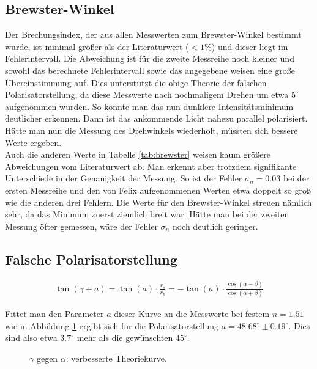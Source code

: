 \documentclass[12pt,a4paper,titlepage,headinclude,bibtotoc]{scrartcl}
\begin{document}
\subsection{Brewster-Winkel}
Der Brechungsindex, der aus allen Messwerten zum Brewster-Winkel bestimmt wurde, ist minimal größer als der Literaturwert ($< 1\%$) und dieser liegt im Fehlerintervall.
Die Abweichung ist für die zweite Messreihe noch kleiner und sowohl das berechnete Fehlerintervall sowie das angegebene weisen eine große Übereinstimmung auf.
Dies unterstützt die obige Theorie der falschen Polarisatorstellung, da diese Messwerte nach nochmaligem Drehen um etwa $5^\circ$ aufgenommen wurden.
So konnte man das nun dunklere Intensitätsminimum deutlicher erkennen.
Dann ist das ankommende Licht nahezu parallel polarisiert.
Hätte man nun die Messung des Drehwinkels wiederholt, müssten sich bessere Werte ergeben.\\

Auch die anderen Werte in Tabelle \ref{tab:brewster} weisen kaum größere Abweichungen vom Literaturwert ab.
Man erkennt aber trotzdem signifikante Unterschiede in der Genauigkeit der Messung.
So ist der Fehler $\sigma_n=0.03$ bei der ersten Messreihe und den von Felix aufgenommenen Werten etwa doppelt so groß wie die anderen drei Fehlern.
Die Werte für den Brewster-Winkel streuen nämlich sehr, da das Minimum zuerst ziemlich breit war.
Hätte man bei der zweiten Messung öfter gemessen, wäre der Fehler $\sigma_n$ noch deutlich geringer.

\subsection{Falsche Polarisatorstellung}

\begin{align}
	\tan(\gamma+a)=\tan(a)\cdot\frac{r_s}{r_p}=-\tan(a)\cdot\frac{\cos(\alpha-\beta)}{\cos(\alpha+\beta)}
\end{align}

Fittet man den Parameter $a$ dieser Kurve an die Messwerte bei festem $n=1.51$ wie in Abbildung \ref{fig:drehung_disk} ergibt sich für die Polarisatorstellung $a=48.68^\circ \pm 0.19^\circ$.
Dies sind also etwa $3.7^\circ$ mehr als die gewünschten $45^\circ$.

\begin{figure}[!htb]
	\centering
	
	\caption{$\gamma$ gegen $\alpha$: verbesserte Theoriekurve.}
	\label{fig:drehung_disk}
\end{figure}




\end{document}
